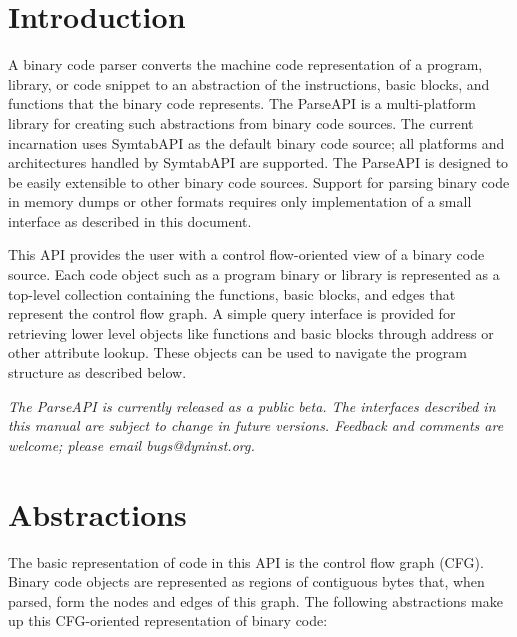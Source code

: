 \documentclass{article}
\begin{document}
\tableofcontents
\clearpage

\section{Introduction}
\label{sec:intro}

A binary code parser converts the machine code representation of a
program, library, or code snippet to an abstraction of the instructions, basic
blocks, and functions that the binary code represents. The ParseAPI is a
multi-platform library for creating such abstractions from binary code sources.
The current incarnation uses SymtabAPI as the default binary code source; all
platforms and architectures handled by SymtabAPI are supported. The ParseAPI is
designed to be easily extensible to other binary code sources. Support for
parsing binary code in memory dumps or other formats requires only
implementation of a small interface as described in this document.

This API provides the user with a control flow-oriented view of a binary code
source. Each code object such as a program binary or library is represented as
a top-level collection containing the functions, basic blocks, and edges that
represent the control flow graph. A simple query interface is provided for
retrieving lower level objects like functions and basic blocks through address
or other attribute lookup. These objects can be used to navigate the
program structure as described below.

\emph{The ParseAPI is currently released as a public beta. The interfaces described in this manual are subject to change in future versions. Feedback and comments are welcome; please email bugs@dyninst.org.}

\section{Abstractions}
\label{sec:abstractions}

The basic representation of code in this API is the control flow
graph (CFG). Binary code objects are represented as regions of contiguous bytes that, when parsed, form the nodes and edges of this graph. The following abstractions make up this CFG-oriented representation of binary code:
\end{document}
